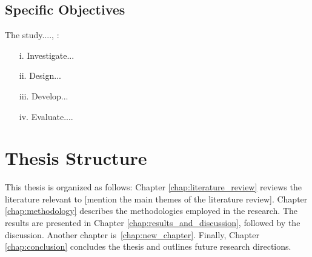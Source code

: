 \subsection{Specific Objectives}
The study...., :
\begin{itemize}
    \item[i.] Investigate...
    \item[ii.] Design...
    \item[iii.] Develop...
    \item[iv.] Evaluate....
\end{itemize}

\section{Thesis Structure}
This thesis is organized as follows: Chapter \ref{chap:literature_review} reviews the literature relevant to [mention the main themes of the literature review]. Chapter \ref{chap:methodology} describes the methodologies employed in the research. The results are presented in Chapter \ref{chap:results_and_discussion}, followed by the discussion. Another chapter is~\ref{chap:new_chapter}.
Finally, Chapter \ref{chap:conclusion} concludes the thesis and outlines future research directions.
